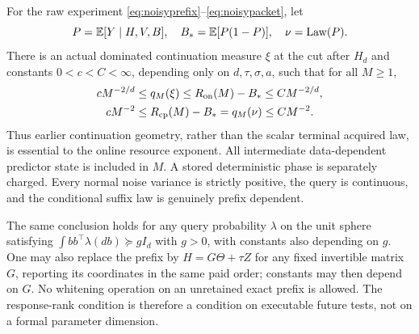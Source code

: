 \begin{theorem}\label{thm:noisy}
For the raw experiment \eqref{eq:noisyprefix}--\eqref{eq:noisypacket}, let
\[
 P=\mathbb E[Y\mid H,V,B],\quad B_*=\mathbb E[P(1-P)],\quad \nu=\operatorname{Law}(P).
\]
There is an actual dominated continuation measure $\xi$ at the cut after $H_d$ and constants $0<c<C<\infty$, depending only on $d,\tau,\sigma,a$, such that for all $M\ge1$,
\begin{align}
 cM^{-2/d}&\le q_M(\xi)\le R_{\mathrm{on}}(M)-B_*\le CM^{-2/d},\label{eq:noisylaw}\\
 cM^{-2}&\le R_{\mathrm{cp}}(M)-B_*=q_M(\nu)\le CM^{-2}.\label{eq:noisycp}
\end{align}
Thus earlier continuation geometry, rather than the scalar terminal acquired law, is essential to the online resource exponent. All intermediate data-dependent predictor state is included in $M$. A stored deterministic phase is separately charged. Every normal noise variance is strictly positive, the query is continuous, and the conditional suffix law is genuinely prefix dependent.

The same conclusion holds for any query probability $\lambda$ on the unit sphere satisfying $\int bb^\top\lambda(db)\succeq gI_d$ with $g>0$, with constants also depending on $g$. One may also replace the prefix by $H=G\Theta+\tau Z$ for any fixed invertible matrix $G$, reporting its coordinates in the same paid order; constants may then depend on $G$. No whitening operation on an unretained exact prefix is allowed. The response-rank condition is therefore a condition on executable future tests, not on a formal parameter dimension.
\end{theorem}
